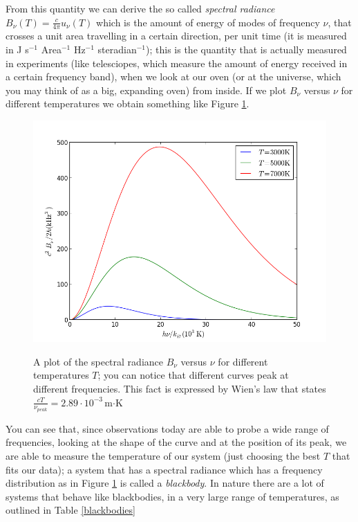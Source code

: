 \documentclass[11pt, a4paper,oneside,openright]{book}
\numberwithin{equation}{section}
\begin{document}
From this quantity we can derive the so called \textit{spectral radiance} $B_\nu(T)=\frac{c}{4\pi}u_\nu(T)$ which is the amount of energy of modes of frequency $\nu$, that crosses a unit area travelling in a certain direction, per unit time (it is measured in J s$^{-1}$ Area$^{-1}$ Hz$^{-1}$ steradian$^{-1}$); this is the quantity that is actually measured in experiments (like telesciopes, which measure the amount of energy received in a certain frequency band), when we look at our oven (or at the universe, which you may think of as a big, expanding oven) from inside. If we plot $B_\nu$ versus $\nu$ for different temperatures we obtain something like Figure \ref{blackbody1}.
\begin{figure}
\begin{center}
\includegraphics[scale=0.7]{Draw/blackbody.png}
\label{}
\end{center}
\caption{A plot of the spectral radiance $B_\nu$ versus $\nu$ for different temperatures $T$; you can notice that different curves peak at different frequencies. This fact is expressed by Wien's law that states $\frac{cT}{\nu_{peak}}=2.89\cdot10^{-3}\,$m$\cdot$K}
\label{blackbody1}
\end{figure}
You can see that, since observations today are able to probe a wide range of frequencies, looking at the shape of the curve and at the position of its peak, we are able to measure the temperature of our system (just choosing the best $T$ that fits our data); a system that has a spectral radiance which has a frequency distribution as in Figure \ref{blackbody1} is called a \textit{blackbody}. In nature there are a lot of systems that behave like blackbodies, in a very large range of temperatures, as outlined in Table \ref{blackbodies}
\end{document}
